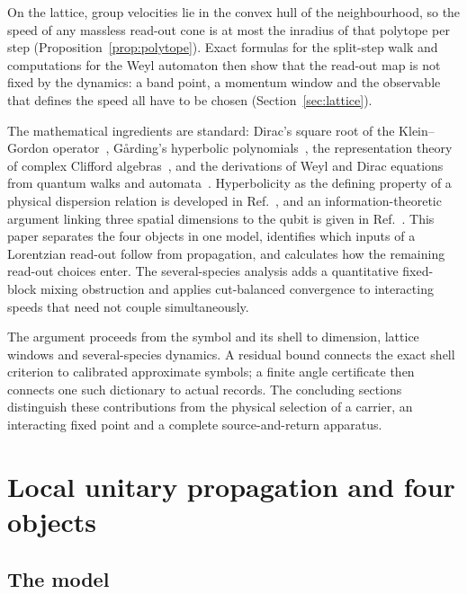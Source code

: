 \documentclass[12pt]{article}
\theoremstyle{definition}
\theoremstyle{remark}
\begin{document}
On the lattice, group velocities lie in the convex hull of the neighbourhood, so the speed of any massless read-out cone is at most the inradius of that polytope per step (Proposition~\ref{prop:polytope}). Exact formulas for the split-step walk and computations for the Weyl automaton then show that the read-out map is not fixed by the dynamics: a band point, a momentum window and the observable that defines the speed all have to be chosen (Section~\ref{sec:lattice}).

The mathematical ingredients are standard: Dirac's square root of the Klein--Gordon operator~\cite{Dirac1928}, G{\aa}rding's hyperbolic polynomials~\cite{Garding1959}, the representation theory of complex Clifford algebras~\cite{LawsonMichelsohn1989}, and the derivations of Weyl and Dirac equations from quantum walks and automata~\cite{BialynickiBirula1994,Strauch2006,DArianoPerinotti2014}. Hyperbolicity as the defining property of a physical dispersion relation is developed in Ref.~\cite{RaetzelRiveraSchuller2011}, and an information-theoretic argument linking three spatial dimensions to the qubit is given in Ref.~\cite{MullerMasanes2013}. This paper separates the four objects in one model, identifies which inputs of a Lorentzian read-out follow from propagation, and calculates how the remaining read-out choices enter. The several-species analysis adds a quantitative fixed-block mixing obstruction and applies cut-balanced convergence to interacting speeds that need not couple simultaneously.

The argument proceeds from the symbol and its shell to dimension, lattice windows and several-species dynamics. A residual bound connects the exact shell criterion to calibrated approximate symbols; a finite angle certificate then connects one such dictionary to actual records. The concluding sections distinguish these contributions from the physical selection of a carrier, an interacting fixed point and a complete source-and-return apparatus.

\section{Local unitary propagation and four objects}
\label{sec:model}

\subsection{The model}
\end{document}
